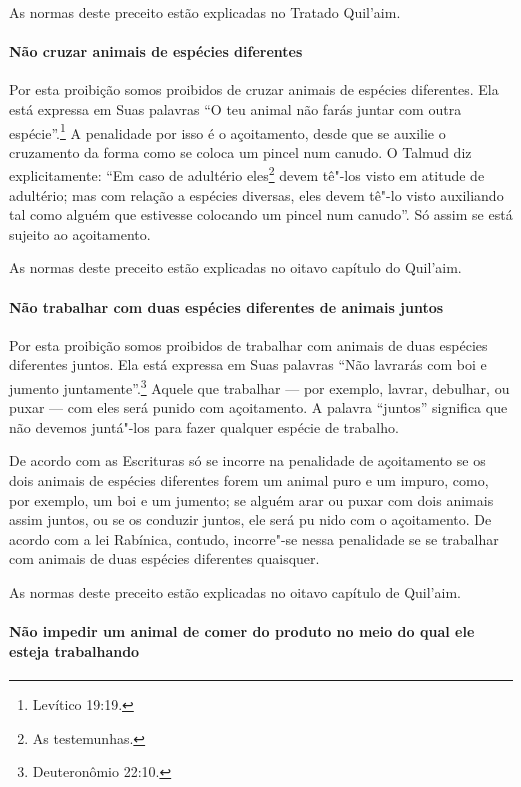 \begin{multicols}{2}
As normas deste preceito estão explicadas no Tratado Quil'aim\starr.

\paragraph{Não cruzar animais de espécies diferentes}

Por esta proibição somos proibidos de cruzar animais de espécies
diferentes. Ela está expressa em Suas palavras ``O teu animal não farás
juntar com outra espécie''.\footnote{Levítico 19:19.} A penalidade por isso é o
açoitamento, desde que se auxilie o cruzamento da forma como se coloca
um pincel num canudo. O Talmud\starr{} diz explicitamente: ``Em caso de
adultério eles\footnote{As testemunhas.} devem tê"-los visto em atitude de
adultério; mas com relação a espécies diversas, eles devem tê"-lo visto
auxiliando tal como alguém que estivesse colocando um pincel num
canudo''. Só assim se está sujeito ao açoitamento.

As normas deste preceito estão explicadas no oitavo capítulo do Quil'aim\starr.

\paragraph{Não trabalhar com duas espécies diferentes de animais juntos}

Por esta proibição somos proibidos de trabalhar com animais de duas
espécies diferentes juntos. Ela está expressa em Suas palavras ``Não
lavrarás com boi e jumento juntamente''.\footnote{Deuteronômio 22:10.} Aquele que trabalhar
--- por exemplo, lavrar, debulhar, ou puxar --- com eles será punido com
açoitamento. A palavra ``juntos'' significa que não devemos juntá"-los
para fazer qualquer espécie de trabalho.

De acordo com as Escrituras só se incorre na penalidade de açoitamento
se os dois animais de espécies diferentes forem um animal puro e um
impuro, como, por exemplo, um boi e um jumento; se alguém arar ou puxar
com dois animais assim juntos, ou se os conduzir juntos, ele será pu
nido com o açoitamento. De acordo com a lei Rabínica, contudo,
incorre"-se nessa penalidade se se trabalhar com animais de duas espécies
diferentes quaisquer.

As normas deste preceito estão explicadas no oitavo capítulo de Quil'aim\starr.

\paragraph{Não impedir um animal de comer do produto no meio do qual ele esteja
trabalhando}


\end{multicols}
